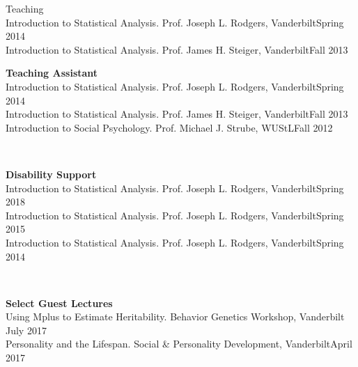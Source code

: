 \begin{rSection}{\textrm{Teaching}}
\\
Introduction to Statistical Analysis. Prof. Joseph L. Rodgers, Vanderbilt\hfill{Spring 2014}\\
Introduction to Statistical Analysis. Prof. James H. Steiger, Vanderbilt\hfill{Fall 2013}%
\medskip\\
\begin{minipage}{\linewidth}{\large {\bf Teaching Assistant}}\\
Introduction to Statistical Analysis. Prof. Joseph L. Rodgers, Vanderbilt\hfill  {Spring 2014}\\
Introduction to Statistical Analysis. Prof. James H. Steiger, Vanderbilt\hfill  {Fall 2013}\\
Introduction to Social Psychology. Prof. Michael J. Strube, WUStL\hfill{Fall 2012}\end{minipage}\medskip\\
\begin{minipage}{\linewidth}{\large {\bf Disability Support}}\\
Introduction to Statistical Analysis. Prof. Joseph L. Rodgers, Vanderbilt\hfill  {Spring 2018}\\
Introduction to Statistical Analysis. Prof. Joseph L. Rodgers, Vanderbilt\hfill  {Spring 2015}\\
Introduction to Statistical Analysis. Prof. Joseph L. Rodgers, Vanderbilt\hfill{Spring 2014}\end{minipage}\medskip\\
\begin{minipage}{\linewidth}{\large {\bf Select Guest Lectures}}\\
Using Mplus to Estimate Heritability. Behavior Genetics Workshop, Vanderbilt \hfill{July 2017}\\
Personality and the Lifespan. Social \& Personality Development, Vanderbilt\hfill {April 2017}\end{minipage}
\end{rSection}
